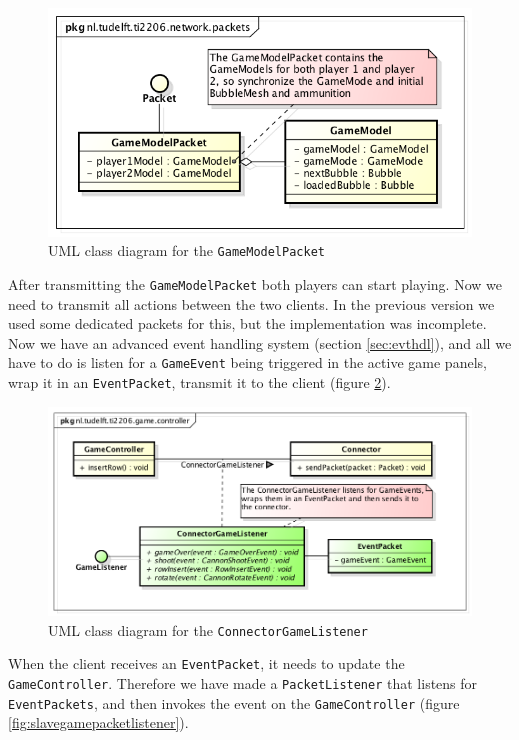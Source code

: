 \documentclass[a4paper]{article}
\begin{document}
\begin{figure}[H]
	\centering
	\includegraphics[scale=0.5]{GameModelPacket.png}
    \caption{UML class diagram for the \texttt{GameModelPacket} }
    \label{fig:gmpacket}
\end{figure}

After transmitting the \texttt{GameModelPacket} both players can start playing. Now we need to transmit all actions between the two clients. In the previous version we used some dedicated packets for this, but the implementation was incomplete. Now we have an advanced event handling system (section \ref{sec:evthdl}), and all we have to do is listen for a \texttt{GameEvent} being triggered in the active game panels, wrap it in an \texttt{EventPacket}, transmit it to the client (figure \ref{fig:connectorgamelistener}).

\begin{figure}[H]
	\centering
	\includegraphics[scale=0.5]{ConnectorGameListenerExtended.png}
    \caption{UML class diagram for the \texttt{ConnectorGameListener} }
    \label{fig:connectorgamelistener}
\end{figure}

When the client receives an \texttt{EventPacket}, it needs to update the \texttt{GameController}. Therefore we have made a \texttt{PacketListener} that listens for \texttt{EventPackets}, and then invokes the event on the \texttt{GameController} (figure \ref{fig:slavegamepacketlistener}).
\end{document}
